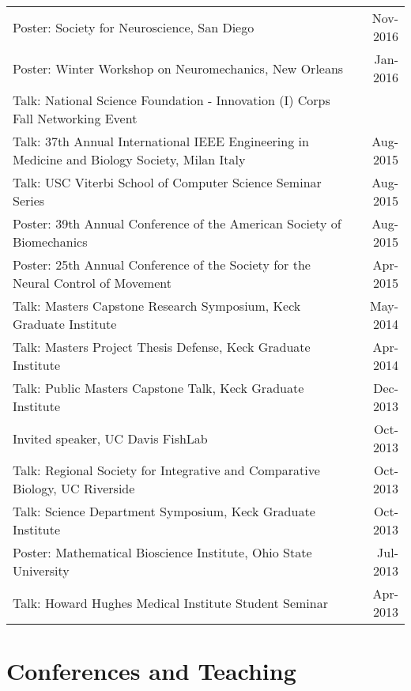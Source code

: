\documentclass[10pt,a4paper]{article}
\begin{document}
  \vspace*{1mm}\noindent\begin{tabularx}{17cm}{X r}
    Poster: Society for Neuroscience, San Diego & Nov-2016 \\ 
    Poster: Winter Workshop on Neuromechanics, New Orleans & Jan-2016 \\ %
    Talk: National Science Foundation - Innovation (I) Corps Fall Networking Event \\
    Talk: 37th Annual International IEEE Engineering in Medicine and Biology Society, Milan Italy & Aug-2015 \\
    Talk: USC Viterbi School of Computer Science Seminar Series & Aug-2015 \\
    Poster: 39th Annual Conference of the American Society of Biomechanics & Aug-2015 \\
    Poster: 25th Annual Conference of the Society for the Neural Control of Movement & Apr-2015 \\
    Talk: Masters Capstone Research Symposium, Keck Graduate Institute & May-2014 \\
    Talk: Masters Project Thesis Defense, Keck Graduate Institute & Apr-2014 \\
    Talk: Public Masters Capstone Talk, Keck Graduate Institute & Dec-2013 \\
    Invited speaker, UC Davis FishLab & Oct-2013 \\
    Talk: Regional Society for Integrative and Comparative Biology, UC Riverside & Oct-2013 \\
    Talk: Science Department Symposium, Keck Graduate Institute & Oct-2013 \\
    Poster: Mathematical Bioscience Institute, Ohio State University & Jul-2013\\
    Talk: Howard Hughes Medical Institute Student Seminar & Apr-2013 \\
  \end{tabularx}

  \vspace*{2mm}\section*{Conferences and Teaching}
\end{document}
